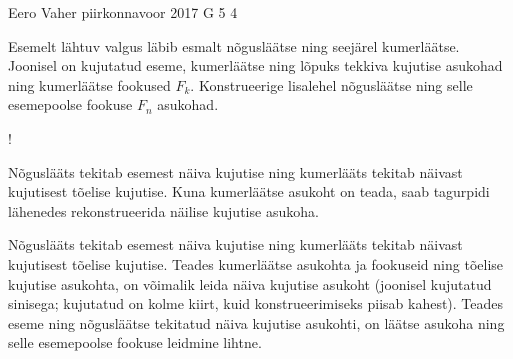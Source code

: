 {Eero Vaher} %
{piirkonnavoor} %
{2017} %
{G 5} %
{4} %
{
\ifStatement
Esemelt lähtuv valgus läbib esmalt nõgusläätse ning seejärel kumerläätse. Joonisel on kujutatud eseme, kumerläätse ning lõpuks tekkiva kujutise asukohad ning kumerläätse fookused $F_k$. Konstrueerige lisalehel nõgusläätse ning selle esemepoolse fookuse $F_n$ asukohad. 

\begin{resizebox}{\linewidth}{!}{
		}
\end{resizebox}
\fi


\ifHint
Nõguslääts tekitab esemest näiva kujutise ning kumerlääts tekitab näivast kujutisest tõelise kujutise. Kuna kumerläätse asukoht on teada, saab tagurpidi lähenedes rekonstrueerida näilise kujutise asukoha.
\fi


\ifSolution
Nõguslääts tekitab esemest näiva kujutise ning kumerlääts tekitab näivast kujutisest tõelise kujutise. Teades kumerläätse asukohta ja fookuseid ning tõelise kujutise asukohta, on võimalik leida näiva kujutise asukoht (joonisel kujutatud sinisega; kujutatud on kolme kiirt, kuid konstrueerimiseks piisab kahest). Teades eseme ning nõgusläätse tekitatud näiva kujutise asukohti, on läätse asukoha ning selle esemepoolse fookuse leidmine lihtne.  

}
